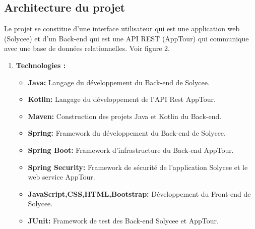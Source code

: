 \documentclass[12pt]{article}
\begin{document}
\subsection{Architecture du projet}

Le projet se constitue d'une interface utilisateur qui est une application web (Solycee) et d'un Back-end qui est une API REST (AppTour) qui communique avec une base de données relationnelles. Voir figure 2.

\begin{enumerate}
\item \textbf{Technologies :}\\

\begin{itemize}
\item \textbf{Java: }Langage du développement du Back-end de Solycee. 
\item \textbf{Kotlin: }Langage du développement de l'API Rest AppTour. 
\item \textbf{Maven: }Construction des projets Java et Kotlin du Back-end.
\item \textbf{Spring: } Framework du développement du Back-end de Solycee.
\item \textbf{Spring Boot: }Framework d'infrastructure du Back-end AppTour.
\item \textbf{Spring Security: } Framework de sécurité de l'application Solycee et le web service AppTour.
\item \textbf{JavaScript,CSS,HTML,Bootstrap: } Développement du Front-end de Solycee.
\item \textbf{JUnit: } Framework de test des Back-end Solycee et AppTour. 
\end{itemize} 
\end{enumerate}
\end{document}
